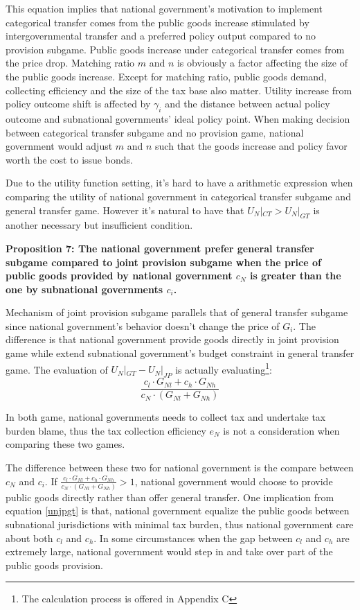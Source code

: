 \begin{itemize}
This equation implies that national government's motivation to implement categorical transfer comes from the public goods increase stimulated by intergovernmental transfer and a preferred policy output compared to no provision subgame. Public goods increase under categorical transfer comes from the price drop. Matching ratio $m$ and $n$ is obviously a factor affecting the size of the public goods increase. Except for matching ratio, public goods demand, collecting efficiency and the size of the tax base also matter. Utility increase from policy outcome shift is affected by $\gamma_i$ and the distance between actual policy outcome and subnational governments' ideal policy point.
When making decision between categorical transfer subgame and no provision game, national government would adjust $m$ and $n$ such that the goods increase and policy favor worth the cost to issue bonds.

Due to the utility function setting, it's hard to have a arithmetic expression when comparing the utility of national government in categorical transfer subgame and general transfer game. However it's natural to have that $U_N|_{CT}>U_N|_{GT}$ is another  necessary but insufficient condition.


\textbf{Proposition 7: The national government prefer general transfer subgame compared to joint provision subgame when the price of public goods provided by national government $c_N$ is greater than the one by subnational governments $c_i$.}

Mechanism of joint provision subgame parallels that of general transfer subgame since national government's behavior doesn't change the price of $G_i$. The difference is that national government provide goods directly in joint provision game while extend subnational government's budget constraint in general transfer game. The evaluation of $U_N|_{GT}-U_N|_{JP}$ is actually evaluating\footnote{The calculation process is offered in Appendix C}:
\begin{equation}
  \frac{c_l\cdot G_{Nl}+c_h\cdot G_{Nh}}{c_N\cdot (G_{Nl}+G_{Nh})}
\end{equation}\label{unjpgt}

In both game, national governments needs to collect tax and undertake tax burden blame, thus the tax collection efficiency $e_N$ is not a consideration when comparing these two games.

The difference between these two for national government is the compare between $c_N$ and $c_i$. If $\frac{c_l\cdot G_{Nl}+c_h\cdot G_{Nh}}{c_N\cdot (G_{Nl}+G_{Nh})}>1$, national government would choose to provide public goods directly rather than offer general transfer. One implication from equation \ref{unjpgt} is that, national government equalize the public goods between subnational jurisdictions with minimal tax burden, thus national government care about both $c_l$ and $c_h$. In some circumstances when the gap between $c_l$ and $c_h$ are extremely large, national government would step in and take over part of the public goods provision.


\end{itemize}
